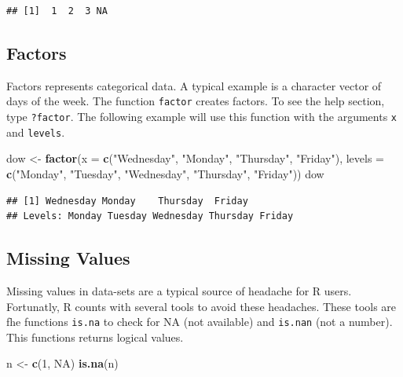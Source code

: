 \documentclass[12pt,graybox,envcountchap,sectrefs]{krantz}
\makeatletter
\newenvironment{Shaded}{\begin{snugshade}}{\end{snugshade}}
\newcommand{\KeywordTok}[1]{\textcolor[rgb]{0.13,0.29,0.53}{\textbf{#1}}}
\newcommand{\DataTypeTok}[1]{\textcolor[rgb]{0.13,0.29,0.53}{#1}}
\newcommand{\DecValTok}[1]{\textcolor[rgb]{0.00,0.00,0.81}{#1}}
\newcommand{\StringTok}[1]{\textcolor[rgb]{0.31,0.60,0.02}{#1}}
\newcommand{\OtherTok}[1]{\textcolor[rgb]{0.56,0.35,0.01}{#1}}
\newcommand{\NormalTok}[1]{#1}
\newenvironment{kframe}{%
\medskip{}
\setlength{\fboxsep}{.8em}
 \def\at@end@of@kframe{}%
 \ifinner\ifhmode%
  \def\at@end@of@kframe{\end{minipage}}%
  \begin{minipage}{\columnwidth}%
 \fi\fi%
 \def\FrameCommand##1{\hskip\@totalleftmargin \hskip-\fboxsep
 \colorbox{shadecolor}{##1}\hskip-\fboxsep
     \hskip-\linewidth \hskip-\@totalleftmargin \hskip\columnwidth}%
 \MakeFramed {\advance\hsize-\width
   \@totalleftmargin\z@ \linewidth\hsize
   \@setminipage}}%
 {\par\unskip\endMakeFramed%
 \at@end@of@kframe}
\renewenvironment{Shaded}{\begin{kframe}}{\end{kframe}}
\theoremstyle{definition}
\theoremstyle{definition}
\theoremstyle{definition}
\theoremstyle{remark}
\makeatother
\begin{document}
\begin{verbatim}
## [1]  1  2  3 NA
\end{verbatim}

\subsection{Factors}\label{factors}

Factors represents categorical data. A typical example is a character
vector of days of the week. The function \texttt{factor} creates
factors. To see the help section, type \texttt{?factor}. The following
example will use this function with the arguments \texttt{x} and
\texttt{levels}.

\begin{Shaded}
\begin{Highlighting}[]
\NormalTok{dow <-}\StringTok{ }\KeywordTok{factor}\NormalTok{(}\DataTypeTok{x =} \KeywordTok{c}\NormalTok{(}\StringTok{"Wednesday"}\NormalTok{, }\StringTok{"Monday"}\NormalTok{, }\StringTok{"Thursday"}\NormalTok{, }\StringTok{"Friday"}\NormalTok{),}
              \DataTypeTok{levels =}  \KeywordTok{c}\NormalTok{(}\StringTok{"Monday"}\NormalTok{, }\StringTok{"Tuesday"}\NormalTok{, }\StringTok{"Wednesday"}\NormalTok{, }\StringTok{"Thursday"}\NormalTok{,}
                          \StringTok{"Friday"}\NormalTok{))}
\NormalTok{dow}
\end{Highlighting}
\end{Shaded}

\begin{verbatim}
## [1] Wednesday Monday    Thursday  Friday   
## Levels: Monday Tuesday Wednesday Thursday Friday
\end{verbatim}

\subsection{Missing Values}\label{missing-values}

Missing values in data-sets are a typical source of headache for R
users. Fortunatly, R counts with several tools to avoid these headaches.
These tools are fhe functions \texttt{is.na} to check for NA (not
available) and \texttt{is.nan} (not a number). This functions returns
logical values.

\begin{Shaded}
\begin{Highlighting}[]
\NormalTok{n <-}\StringTok{ }\KeywordTok{c}\NormalTok{(}\DecValTok{1}\NormalTok{, }\OtherTok{NA}\NormalTok{)}
\KeywordTok{is.na}\NormalTok{(n)}
\end{Highlighting}
\end{Shaded}
\end{document}
